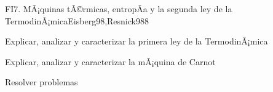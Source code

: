 \begin{syllabus}
\begin{unit}{FI7. MÃ¡quinas tÃ©rmicas, entropÃ­a y la segunda ley de la TermodinÃ¡mica}{Eisberg98,Resnick98}{8}
   \begin{unitgoals}
         \item  Explicar, analizar y caracterizar la primera ley de la TermodinÃ¡mica
         \item  Explicar, analizar y caracterizar la mÃ¡quina de Carnot
         \item  Resolver problemas
   \end{unitgoals}
\end{unit}

\begin{coursebibliography}
\end{coursebibliography}

\end{syllabus}

%
